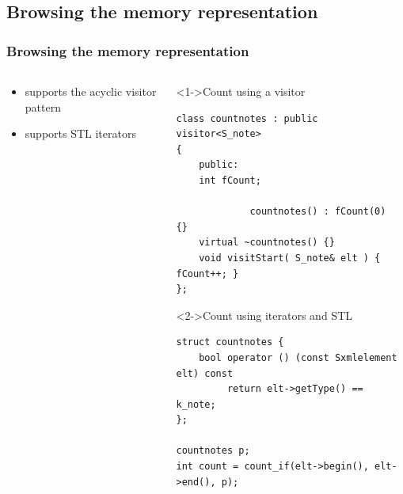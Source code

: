 \documentclass{paper}
\begin{document}
\subsection{Browsing the memory representation}
\begin{frame}[fragile]
	\frametitle{Browsing the memory representation}

	\begin{columns}
		\begin{column}[c]{50mm}
		\begin{itemize}
			\item<1-> supports the acyclic visitor pattern
		\vspace{25mm}
			\item<2-> supports STL iterators
	   \end{itemize}
		\end{column}

		\begin{column}[c]{65mm}
		\begin{block}<1->{Count using a visitor}
\begin{lstlisting}
class countnotes : public visitor<S_note>
{
    public:
    int fCount;

             countnotes() : fCount(0)	{}
    virtual ~countnotes() {}
    void visitStart( S_note& elt ) { fCount++; }
};
\end{lstlisting}
		\end{block}

		\begin{block}<2->{Count using iterators and STL}
\begin{lstlisting}
struct countnotes {
    bool operator () (const Sxmlelement elt) const
         return elt->getType() == k_note;
};

countnotes p;
int count = count_if(elt->begin(), elt->end(), p);
\end{lstlisting}
		\end{block}
		\end{column}
	\end{columns}
\end{frame}

\end{document}
